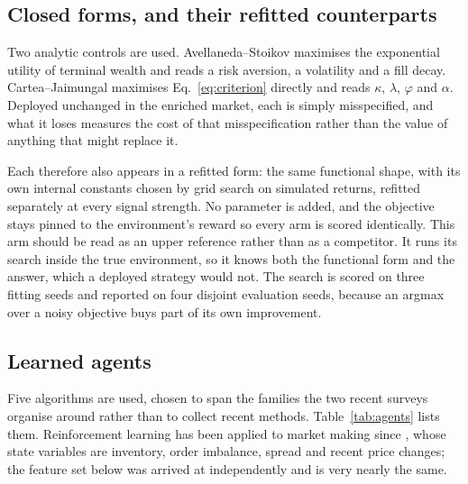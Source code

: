 \documentclass[10pt,twocolumn]{article}
\begin{document}
\subsection{Closed forms, and their refitted counterparts}

Two analytic controls are used. Avellaneda--Stoikov \citep{avellaneda2008} maximises the exponential utility of
terminal wealth and reads a risk aversion, a volatility and a fill decay. Cartea--Jaimungal
\citep{cartea2015book} maximises Eq.~\eqref{eq:criterion} directly and reads $\kappa$, $\lambda$, $\varphi$ and
$\alpha$. Deployed unchanged in the enriched market, each is simply misspecified, and what it loses measures the
cost of that misspecification rather than the value of anything that might replace it.

Each therefore also appears in a refitted form: the same functional shape, with its own internal constants chosen
by grid search on simulated returns, refitted separately at every signal strength. No parameter is added, and the
objective stays pinned to the environment's reward so every arm is scored identically. This arm should be read as
an upper reference rather than as a competitor. It runs its search inside the true environment, so it knows both
the functional form and the answer, which a deployed strategy would not. The search is scored on three fitting
seeds and reported on four disjoint evaluation seeds, because an argmax over a noisy objective buys part of its
own improvement.

\subsection{Learned agents}

Five algorithms are used, chosen to span the families the two recent surveys organise around
\citep{bai2024review, ghasemi2025survey} rather than to collect recent methods. Table~\ref{tab:agents} lists them.
Reinforcement learning has been applied to market making since \citet{chan2001}, whose state variables are
inventory, order imbalance, spread and recent price changes; the feature set below was arrived at independently
and is very nearly the same.
\end{document}
